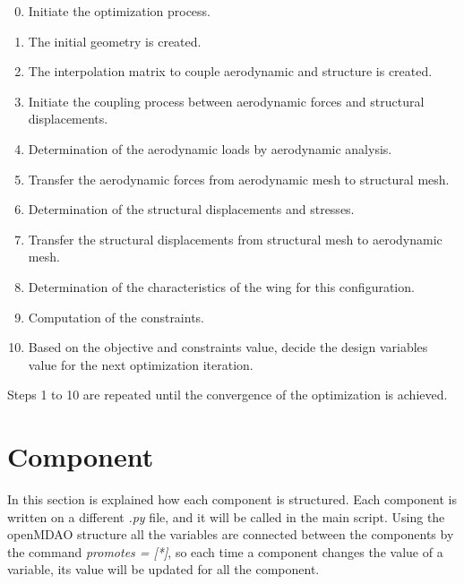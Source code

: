 \begin{enumerate}
	\setcounter{enumi}{-1}
	\item Initiate the optimization process.
	\item  The initial geometry is created.
	\item  The interpolation matrix to couple aerodynamic and structure is created.
	\item  Initiate the coupling process between aerodynamic forces and structural displacements.
	\item Determination of the aerodynamic loads by aerodynamic analysis.
	\item  Transfer the aerodynamic forces from aerodynamic mesh to structural mesh.
	\item Determination of the structural displacements and stresses.
	\item Transfer the structural displacements from structural mesh to aerodynamic mesh.
	\item Determination of the characteristics of the wing for this configuration.
	\item  Computation of the constraints.
	\item Based on the objective and constraints value, decide the design variables value for the next optimization iteration.
\end{enumerate}
Steps 1 to 10 are repeated until the convergence of the optimization is achieved.\\

\section{Component}
In this section is explained how each component is structured. Each component is written on a different \textit{.py} file, and it will be called in the main script. Using the openMDAO structure all the variables are connected between the components by the command \textit{promotes = [*]}, so each time a component changes the value of a variable, its value will be updated for all the component.
